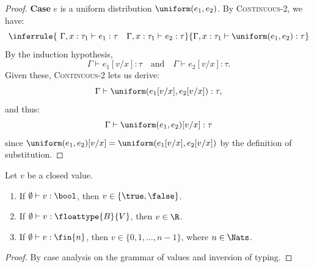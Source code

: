 \begin{proof}
	\textbf{Case} $e$ is a uniform distribution $\uniform(e_1,e_2)$. By \textsc{Continuous-2}, we have:
	\[
		\inferrule
		{\ \Gamma, x : \tau_1 \vdash e_1 : \tau \quad \Gamma, x : \tau_1 \vdash e_2 : \tau}
		{\Gamma, x : \tau_1 \vdash \uniform(e_1,e_2) : \tau}
	\]
	By the induction hypothesis,
	\[
		\Gamma \vdash e_1[v/x] : \tau
		\quad\text{and}\quad
		\Gamma \vdash e_2[v/x] : \tau.
	\]
	Given these, \textsc{Continuous-2} lets us derive:
	\[
		\Gamma \vdash \uniform(e_1[v/x], e_2[v/x]) : \tau,
	\]
	and thus:
	\[
		\Gamma \vdash \uniform(e_1,e_2)[v/x] : \tau
	\]
	since $\uniform(e_1,e_2)[v/x] = \uniform(e_1[v/x], e_2[v/x])$ by the definition of substitution.
\end{proof}


\begin{lemma}\label{lem:canonical-forms}
	Let $v$ be a closed value. 
	\begin{enumerate}
		\item If $\emptyset \vdash v : \bool$, then $v \in \{\true, \false\}$.
		\item If $\emptyset \vdash v : \floattype{B}{V}$, then $v \in \R$.
		\item If $\emptyset \vdash v : \fin{n}$, then $v \in \{0, 1, \ldots, n-1\}$, where $n \in \Nats$.
	\end{enumerate}
\end{lemma}

\begin{proof}
	By case analysis on the grammar of values and inversion of typing.
\end{proof}

